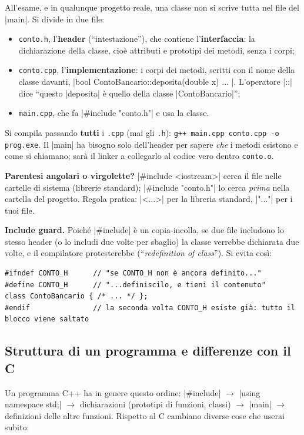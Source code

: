 All'esame, e in qualunque progetto reale, una classe non si scrive tutta nel
file del \cc|main|. Si divide in due file:
\begin{itemize}
  \item \texttt{conto.h}, l'\textbf{header} (``intestazione''), che contiene
        l'\textbf{interfaccia}: la dichiarazione della classe, cioè attributi e
        prototipi dei metodi, senza i corpi;
  \item \texttt{conto.cpp}, l'\textbf{implementazione}: i corpi dei metodi,
        scritti con il nome della classe davanti,
        \cc|bool ContoBancario::deposita(double x) { ... }|. L'operatore \cc|::|
        dice ``questo \cc|deposita| è quello della classe \cc|ContoBancario|'';
  \item \texttt{main.cpp}, che fa \cc|#include "conto.h"| e usa la classe.
\end{itemize}
Si compila passando \textbf{tutti} i \texttt{.cpp} (mai gli \texttt{.h}):
\texttt{g++ main.cpp conto.cpp -o prog.exe}. Il \cc|main| ha bisogno solo
dell'header per sapere \emph{che} i metodi esistono e come si chiamano; sarà il
linker a collegarlo al codice vero dentro \texttt{conto.o}.

\textbf{Parentesi angolari o virgolette?}
\cc|#include <iostream>| cerca il file nelle cartelle di sistema (librerie
standard); \cc|#include "conto.h"| lo cerca \emph{prima} nella cartella del
progetto. Regola pratica: \cc|<...>| per la libreria standard, \cc|"..."| per i
tuoi file.

\textbf{Include guard.} Poiché \cc|#include| è un copia-incolla, se due file
includono lo stesso header (o lo includi due volte per sbaglio) la classe
verrebbe dichiarata due volte, e il compilatore protesterebbe
(``\emph{redefinition of class}''). Si evita così:
\begin{lstlisting}
#ifndef CONTO_H      // "se CONTO_H non è ancora definito..."
#define CONTO_H      // "...definiscilo, e tieni il contenuto"
class ContoBancario { /* ... */ };
#endif               // la seconda volta CONTO_H esiste già: tutto il blocco viene saltato
\end{lstlisting}

\subsection*{Struttura di un programma e differenze con il C}

Un programma C++ ha in genere questo ordine: \cc|#include| $\rightarrow$
\cc|using namespace std;| $\rightarrow$ dichiarazioni (prototipi di funzioni,
classi) $\rightarrow$ \cc|main| $\rightarrow$ definizioni delle altre funzioni.
Rispetto al C cambiano diverse cose che userai subito:

